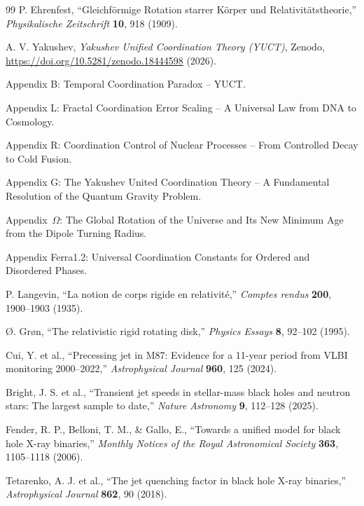 \documentclass[12pt,a4paper]{article}
\begin{document}
	\begin{thebibliography}{99}
		P. Ehrenfest, ``Gleichf{\"o}rmige Rotation starrer K{\"o}rper und Relativit{\"a}tstheorie,'' \emph{Physikalische Zeitschrift} \textbf{10}, 918 (1909).
		
		A. V. Yakushev, \emph{Yakushev Unified Coordination Theory (YUCT)}, Zenodo, \url{https://doi.org/10.5281/zenodo.18444598} (2026).
		
		Appendix B: Temporal Coordination Paradox -- YUCT.
		
		Appendix L: Fractal Coordination Error Scaling -- A Universal Law from DNA to Cosmology.
		
		Appendix R: Coordination Control of Nuclear Processes -- From Controlled Decay to Cold Fusion.
		
		Appendix G: The Yakushev United Coordination Theory -- A Fundamental Resolution of the Quantum Gravity Problem.
		
		Appendix~\(\Omega\): The Global Rotation of the Universe and Its New Minimum Age from the Dipole Turning Radius.
		
		Appendix Ferra1.2: Universal Coordination Constants for Ordered and Disordered Phases.
		
		P. Langevin, ``La notion de corps rigide en relativit{\'e},'' \emph{Comptes rendus} \textbf{200}, 1900--1903 (1935).
		
		{\O}. Gr{\o}n, ``The relativistic rigid rotating disk,'' \emph{Physics Essays} \textbf{8}, 92--102 (1995).
		
		Cui, Y. et al., ``Precessing jet in M87: Evidence for a 11-year period from VLBI monitoring 2000–2022,'' \emph{Astrophysical Journal} \textbf{960}, 125 (2024).
			
		Bright, J. S. et al., ``Transient jet speeds in stellar-mass black holes and neutron stars: The largest sample to date,'' \emph{Nature Astronomy} \textbf{9}, 112–128 (2025).
			
		Fender, R. P., Belloni, T. M., \& Gallo, E., ``Towards a unified model for black hole X-ray binaries,'' \emph{Monthly Notices of the Royal Astronomical Society} \textbf{363}, 1105–1118 (2006).
			
		Tetarenko, A. J. et al., ``The jet quenching factor in black hole X-ray binaries,'' \emph{Astrophysical Journal} \textbf{862}, 90 (2018).
			

\end{thebibliography}
\end{document}
